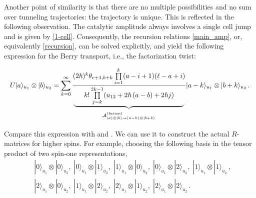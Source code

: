 \documentclass[10pt]{article}
\theoremstyle{definition}
\def\CA{{\cal A}}
\def\lm{\limits}
\numberwithin{equation}{section}
\begin{document}
Another point of similarity is that there are no multiple possibilities and no sum over tunneling trajectories: the trajectory is unique.
This is reflected in the following observation.
The catalytic amplitude always involves a single cell jump and is given by \eqref{1-cell}.
Consequently, the recursion relations \eqref{main_amp}, or, equivalently \eqref{recursion}, can be solved explicitly, and yield the following expression for the Berry transport, i.e., the factorization twist:
\begin{equation}
	\raisebox{-5mm}{$\begin{array}{c}
		\begin{tikzpicture}
			\node{$\displaystyle U|a\rangle_{u_1}\otimes|b\rangle_{u_2}=\sum\lm_{k=0}^{\infty}\frac{(2\hbar)^k\theta_{r+1,b+k}\prod\lm_{i=1}^{k}(a-i+1)(\ell-a+i)}{k!\prod\lm_{j=k}^{2k-1}(u_{12}+2\hbar\left(a-b\right)+2\hbar j)}|a-k\rangle_{u_1}\otimes|b+k\rangle_{u_2}\,.$};
			\foreach \x/\y/\h in {-2.9/2.8/-0.9} {
				\draw[ultra thin, fill] (\x,\h) to[out=270,in=180] (\x+0.3,\h-0.17) -- (0.5*\x+0.5*\y-0.3,\h-0.17) to[out=0,in=90] (0.5*\x+0.5*\y,\h-0.3) to[out=90,in=0] (0.5*\x+0.5*\y-0.3,\h-0.13) -- (\x+0.3,\h-0.13) to[out=180,in=270] (\x,\h);
				\draw[ultra thin, fill] (\y,\h) to[out=270,in=0] (\y-0.3,\h-0.17) -- (0.5*\x+0.5*\y+0.3,\h-0.17) to[out=180,in=90] (0.5*\x+0.5*\y,\h-0.3) to[out=90,in=180] (0.5*\x+0.5*\y+0.3,\h-0.13) -- (\y-0.3,\h-0.13) to[out=0,in=270] (\y,\h);
				\node[below] at (0.5*\x+0.5*\y,\h-0.3) {$\scriptstyle \CA^{\rm (fusion)}_{|a\rangle\otimes|b\rangle \to |a-k\rangle\otimes|b+k\rangle}$};
			}
		\end{tikzpicture}
	\end{array}$}
\end{equation}
Compare this expression with \cite[Prop.~3.15]{Pfeiffer2000Yangian} and \cite[Prop.~5]{Bykov:2019cst}.
We can use it to construct the actual $R$-matrices for higher spins.
For example, choosing the following basis in the tensor product of two spin-one representations,
\begin{equation}
	\begin{aligned}
		&|0\rangle_{u_1}\otimes|0\rangle_{u_2},\;|0\rangle_{u_1}\otimes|1\rangle_{u_2},\;|1\rangle_{u_1}\otimes|0\rangle_{u_2},\;|0\rangle_{u_1}\otimes|2\rangle_{u_2},\;|1\rangle_{u_1}\otimes|1\rangle_{u_2}\,,\\
		&|2\rangle_{u_1}\otimes|0\rangle_{u_2},\;|1\rangle_{u_1}\otimes|2\rangle_{u_2},\;|2\rangle_{u_1}\otimes|1\rangle_{u_2},\;|2\rangle_{u_1}\otimes|2\rangle_{u_2}\,.
	\end{aligned}
\end{equation}
\end{document}
